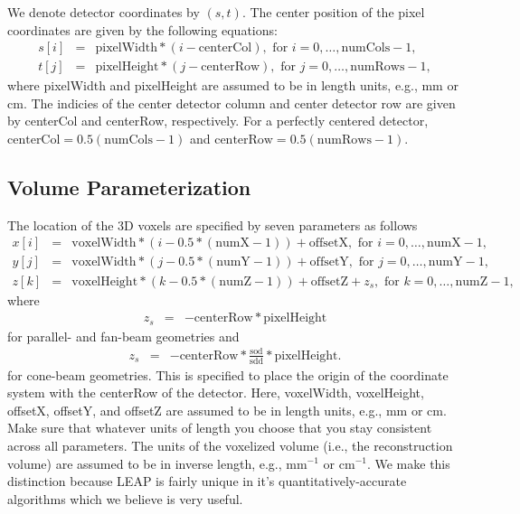 \documentclass[11pt]{article}
\begin{document}
We denote detector coordinates by $(s,t)$.  The center position of the pixel coordinates are given by the following equations:
\begin{eqnarray*}
s[i] &=& \text{pixelWidth}*(i - \text{centerCol}), \text{ for } i = 0, \dots, \text{numCols}-1, \\
t[j] &=& \text{pixelHeight}*(j - \text{centerRow}), \text{ for } j = 0, \dots, \text{numRows}-1,
\end{eqnarray*}
where pixelWidth and pixelHeight are assumed to be in length units, e.g., mm or cm.  The indicies of the center detector column and center detector row are given by centerCol and centerRow, respectively.  For a perfectly centered detector, $\text{centerCol} = 0.5(\text{numCols}-1)$ and $\text{centerRow} = 0.5(\text{numRows}-1)$.

\subsection{Volume Parameterization} \label{sec:VolumeParameterization}

The location of the 3D voxels are specified by seven parameters as follows
\begin{eqnarray*}
x[i] &=& \text{voxelWidth}*(i - 0.5*(\text{numX}-1)) + \text{offsetX}, \text{ for } i = 0, \dots, \text{numX}-1, \\
y[j] &=& \text{voxelWidth}*(j - 0.5*(\text{numY}-1)) + \text{offsetY}, \text{ for } j = 0, \dots, \text{numY}-1, \\
z[k] &=& \text{voxelHeight}*(k - 0.5*(\text{numZ}-1)) + \text{offsetZ} + z_s, \text{ for } k = 0, \dots, \text{numZ}-1,
\end{eqnarray*}
where
\begin{eqnarray*}
z_s &=& -\text{centerRow} * \text{pixelHeight}
\end{eqnarray*}
for parallel- and fan-beam geometries and
\begin{eqnarray*}
z_s &=& -\text{centerRow} * \frac{\text{sod}}{\text{sdd}} * \text{pixelHeight}.
\end{eqnarray*}
for cone-beam geometries.  This is specified to place the origin of the coordinate system with the centerRow of the detector.  Here, voxelWidth, voxelHeight, offsetX, offsetY, and offsetZ are assumed to be in length units, e.g., mm or cm.  Make sure that whatever units of length you choose that you stay consistent across all parameters.  The units of the voxelized volume (i.e., the reconstruction volume) are assumed to be in inverse length, e.g., mm$^{-1}$ or cm$^{-1}$.  We make this distinction because LEAP is fairly unique in it's quantitatively-accurate algorithms which we believe is very useful.
\end{document}
